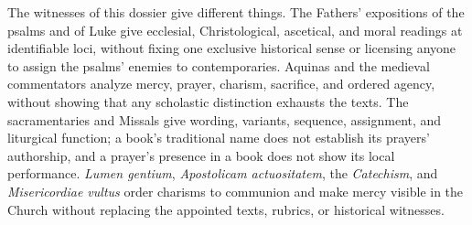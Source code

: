 The witnesses of this dossier give different things. The Fathers' expositions
of the psalms and of Luke give ecclesial, Christological, ascetical, and moral
readings at identifiable loci, without fixing one exclusive historical sense
or licensing anyone to assign the psalms' enemies to contemporaries. Aquinas
and the medieval commentators analyze mercy, prayer, charism, sacrifice, and
ordered agency, without showing that any scholastic distinction exhausts the
texts. The
sacramentaries and Missals give wording, variants, sequence, assignment, and
liturgical function; a book's traditional name does not establish its
prayers' authorship, and a prayer's presence in a book does not show its
local performance. \emph{Lumen gentium}, \emph{Apostolicam actuositatem}, the
\emph{Catechism}, and \emph{Misericordiae vultus} order charisms to communion
and make mercy visible in the Church without replacing the appointed texts,
rubrics, or historical witnesses.
